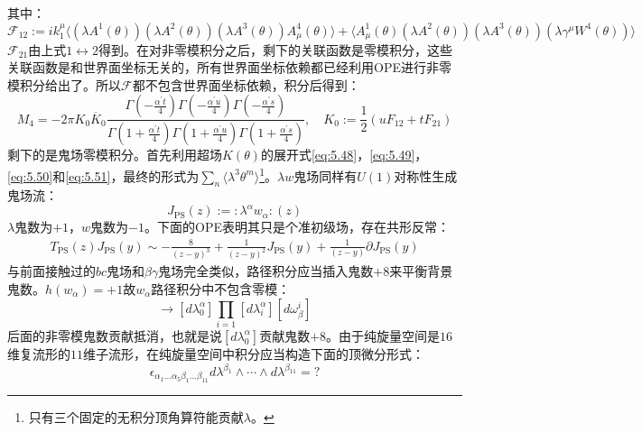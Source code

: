 其中：
\begin{equation}
	\mathcal{F}_{12} := i k_1^\mu \big\langle (\lambda A^1(\theta))(\lambda A^2(\theta))(\lambda A^3(\theta)) A_\mu^4(\theta) \big\rangle + \big\langle A_\mu^1(\theta) (\lambda A^2(\theta))(\lambda A^3(\theta))(\lambda \gamma^\mu W^4(\theta)) \big\rangle
\end{equation}
$\mathcal{F}_{21}$由上式$1\leftrightarrow 2$得到。在对非零模积分之后，剩下的关联函数是零模积分，这些关联函数是和世界面坐标无关的，所有世界面坐标依赖都已经利用OPE进行非零模积分给出了。所以$\mathcal{F}$都不包含世界面坐标依赖，积分后得到：
\begin{equation}
		M_4=-2\pi K_0\overline{K}_0\frac{\Gamma(-\frac{\alpha^{\prime}t}{4})\Gamma(-\frac{\alpha^{\prime}u}{4})\Gamma(-\frac{\alpha^{\prime}s}{4})}{\Gamma(1+\frac{\alpha^{\prime}t}{4})\Gamma(1+\frac{\alpha^{\prime}u}{4})\Gamma(1+\frac{\alpha^{\prime}s}{4})},\quad 
		K_0:=\frac{1}{2}(uF_{12}+tF_{21})
\end{equation}
剩下的是鬼场零模积分。首先利用超场$K(\theta)$的展开式\ref{eq:5.48}，\ref{eq:5.49}，\ref{eq:5.50}和\ref{eq:5.51}，最终的形式为$\sum_{n}\langle{\lambda^3\theta^m}\rangle$\footnote{只有三个固定的无积分顶角算符能贡献$\lambda$。}。$\lambda w$鬼场同样有$U(1)$对称性生成鬼场流：
\begin{equation}
	J_{\text{PS}}(z):=:\lambda^\alpha w_{\alpha}:(z)
\end{equation}
$\lambda$鬼数为$+1$，$w$鬼数为$-1$。下面的OPE表明其只是个准初级场，存在共形反常：
\begin{equation}
	\begin{aligned}
		T_{\text{PS}}(z)J_{\text{PS}}(y)\sim-\frac{8}{(z-y)^3}+\frac{1}{(z-y)^2}J_{\text{PS}}(y)+\frac{1}{(z-y)}\partial J_{\text{PS}}(y)
	\end{aligned}
\end{equation}
与前面接触过的$bc$鬼场和$\beta\gamma$鬼场完全类似，路径积分应当插入鬼数$+8$来平衡背景鬼数。$h(w_\alpha) = +1$故$w_\alpha$路径积分中不包含零模：
\begin{equation}
	[\mathcal{D}\lambda][\mathcal{D}\omega]\to[d\lambda_0^\alpha]\prod_{i=1}[d\lambda_i^\alpha][d\omega_\beta^i]
\end{equation}
后面的非零模鬼数贡献抵消，也就是说$[d\lambda_0^\alpha]$贡献鬼数$+8$。由于纯旋量空间是$16$维复流形的$11$维子流形，在纯旋量空间中积分应当构造下面的顶微分形式：
\begin{equation}
	\epsilon_{\alpha_1...\alpha_5\beta_1...\beta_{11}}d\lambda^{\beta_1}\wedge\cdots\wedge d\lambda^{\beta_{11}}=?
\end{equation}
